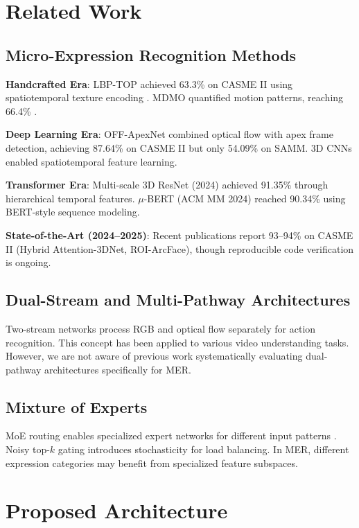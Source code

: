\documentclass[preprint,12pt,authoryear]{elsarticle}
\begin{document}
\section{Related Work}

\subsection{Micro-Expression Recognition Methods}

\textbf{Handcrafted Era}: LBP-TOP achieved 63.3\% on CASME II using spatiotemporal texture encoding \cite{zhao2014lpbtop}. MDMO quantified motion patterns, reaching 66.4\% \cite{liu2016mdmo}.

\textbf{Deep Learning Era}: OFF-ApexNet combined optical flow with apex frame detection, achieving 87.64\% on CASME II but only 54.09\% on SAMM. 3D CNNs enabled spatiotemporal feature learning.

\textbf{Transformer Era}: Multi-scale 3D ResNet (2024) achieved 91.35\% through hierarchical temporal features. $\mu$-BERT (ACM MM 2024) reached 90.34\% using BERT-style sequence modeling.

\textbf{State-of-the-Art (2024--2025)}: Recent publications report 93--94\% on CASME II (Hybrid Attention-3DNet, ROI-ArcFace), though reproducible code verification is ongoing.

\subsection{Dual-Stream and Multi-Pathway Architectures}

Two-stream networks \cite{simonyan2014two} process RGB and optical flow separately for action recognition. This concept has been applied to various video understanding tasks. However, we are not aware of previous work systematically evaluating dual-pathway architectures specifically for MER.

\subsection{Mixture of Experts}

MoE routing enables specialized expert networks for different input patterns \cite{shazeer2017outrageously}. Noisy top-$k$ gating introduces stochasticity for load balancing. In MER, different expression categories may benefit from specialized feature subspaces.

\section{Proposed Architecture}
\end{document}
